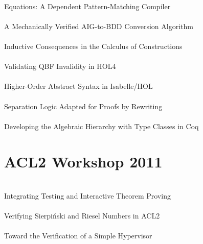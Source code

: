\documentclass{article}
\begin{document}
\cite{10-sozeau-equations} \\
{Equations:} A Dependent Pattern-Matching Compiler \\

\cite{10-swords-conversion} \\
A Mechanically Verified {AIG}-to-{BDD} Conversion Algorithm \\

\cite{10-walukiewicz-chrzaszcz-consequences} \\
Inductive Consequences in the {Calculus} of {Constructions} \\

\cite{10-weber-qbf} \\
Validating {QBF} Invalidity in {HOL4} \\

\cite{10-howe-hoas} \\
Higher-Order Abstract Syntax in {Isabelle/HOL} \\

\cite{10-myreen-separation} \\
Separation Logic Adapted for Proofs by Rewriting \\

\cite{10-spitters-hierarchy} \\
Developing the Algebraic Hierarchy with Type Classes in {Coq} \\


\section{ACL2 Workshop 2011}

\cite{11-chamarthi-testing} \\
Integrating Testing and Interactive Theorem Proving \\

\cite{11-cowles-sierpinski} \\
Verifying {Sierpi\'nski} and {Riesel} Numbers in {ACL2} \\

\cite{11-dahlin-hypervisor} \\
Toward the Verification of a Simple Hypervisor \\
\end{document}
